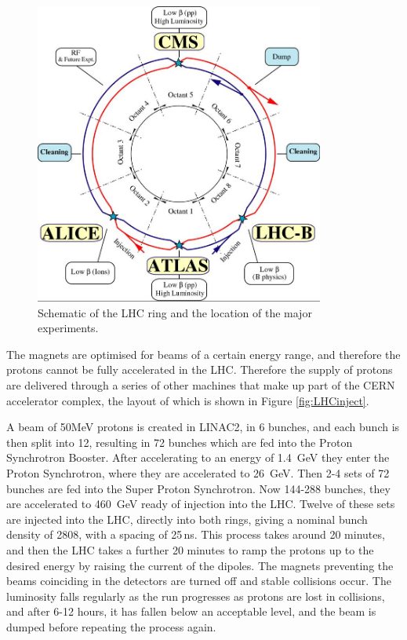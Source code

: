 \begin{figure}[htbp]
\centering
\includegraphics[width=0.85\textwidth]{Figures/Detector/lhc-schematic}
\caption{Schematic of the LHC ring and the location of the major experiments.}
\label{fig:LHC}
\end{figure}


The magnets are optimised for beams of a certain energy range, and therefore the protons cannot be fully accelerated in the LHC. Therefore the supply of protons are delivered through a series of other machines that make up part of the CERN accelerator complex, the layout of which is shown in Figure \ref{fig:LHCinject}. 

A beam of 50MeV protons is created in LINAC2, in 6 bunches, and each bunch is then split into 12, resulting in 72 bunches which are fed into the Proton Synchrotron Booster. After accelerating to an energy of 1.4~GeV they enter the Proton Synchrotron, where they are accelerated to 26~GeV. Then 2-4 sets of 72 bunches are fed into the Super Proton Synchrotron. Now 144-288 bunches, they are accelerated to 460~GeV ready of injection into the LHC. Twelve of these sets are injected into the LHC, directly into both rings, giving a nominal bunch density of 2808, with a spacing of 25\,ns. This process takes around 20 minutes, and then the LHC takes a further 20 minutes to ramp the protons up to the desired energy by raising the current of the dipoles. The magnets preventing the beams coinciding in the detectors are turned off and stable collisions occur. The luminosity falls regularly as the run progresses as protons are lost in collisions, and after 6-12 hours, it has fallen below an acceptable level, and the beam is dumped before repeating the process again. 


